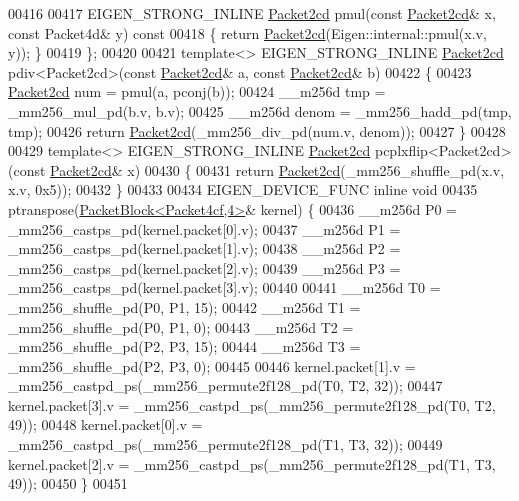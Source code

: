 \begin{DoxyCode}
00416 
00417   EIGEN\_STRONG\_INLINE \hyperlink{struct_eigen_1_1internal_1_1_packet2cd}{Packet2cd} pmul(\textcolor{keyword}{const} \hyperlink{struct_eigen_1_1internal_1_1_packet2cd}{Packet2cd}& x, \textcolor{keyword}{const} Packet4d& y)\textcolor{keyword}{ const}
00418 \textcolor{keyword}{  }\{ \textcolor{keywordflow}{return} \hyperlink{struct_eigen_1_1internal_1_1_packet2cd}{Packet2cd}(Eigen::internal::pmul(x.v, y)); \}
00419 \};
00420 
00421 \textcolor{keyword}{template}<> EIGEN\_STRONG\_INLINE \hyperlink{struct_eigen_1_1internal_1_1_packet2cd}{Packet2cd} pdiv<Packet2cd>(\textcolor{keyword}{const} 
      \hyperlink{struct_eigen_1_1internal_1_1_packet2cd}{Packet2cd}& a, \textcolor{keyword}{const} \hyperlink{struct_eigen_1_1internal_1_1_packet2cd}{Packet2cd}& b)
00422 \{
00423   \hyperlink{struct_eigen_1_1internal_1_1_packet2cd}{Packet2cd} num = pmul(a, pconj(b));
00424   \_\_m256d tmp = \_mm256\_mul\_pd(b.v, b.v);
00425   \_\_m256d denom = \_mm256\_hadd\_pd(tmp, tmp);
00426   \textcolor{keywordflow}{return} \hyperlink{struct_eigen_1_1internal_1_1_packet2cd}{Packet2cd}(\_mm256\_div\_pd(num.v, denom));
00427 \}
00428 
00429 \textcolor{keyword}{template}<> EIGEN\_STRONG\_INLINE \hyperlink{struct_eigen_1_1internal_1_1_packet2cd}{Packet2cd} pcplxflip<Packet2cd>(\textcolor{keyword}{const} 
      \hyperlink{struct_eigen_1_1internal_1_1_packet2cd}{Packet2cd}& x)
00430 \{
00431   \textcolor{keywordflow}{return} \hyperlink{struct_eigen_1_1internal_1_1_packet2cd}{Packet2cd}(\_mm256\_shuffle\_pd(x.v, x.v, 0x5));
00432 \}
00433 
00434 EIGEN\_DEVICE\_FUNC \textcolor{keyword}{inline} \textcolor{keywordtype}{void}
00435 ptranspose(\hyperlink{struct_eigen_1_1internal_1_1_packet_block}{PacketBlock<Packet4cf,4>}& kernel) \{
00436   \_\_m256d P0 = \_mm256\_castps\_pd(kernel.packet[0].v);
00437   \_\_m256d P1 = \_mm256\_castps\_pd(kernel.packet[1].v);
00438   \_\_m256d P2 = \_mm256\_castps\_pd(kernel.packet[2].v);
00439   \_\_m256d P3 = \_mm256\_castps\_pd(kernel.packet[3].v);
00440 
00441   \_\_m256d T0 = \_mm256\_shuffle\_pd(P0, P1, 15);
00442   \_\_m256d T1 = \_mm256\_shuffle\_pd(P0, P1, 0);
00443   \_\_m256d T2 = \_mm256\_shuffle\_pd(P2, P3, 15);
00444   \_\_m256d T3 = \_mm256\_shuffle\_pd(P2, P3, 0);
00445 
00446   kernel.packet[1].v = \_mm256\_castpd\_ps(\_mm256\_permute2f128\_pd(T0, T2, 32));
00447   kernel.packet[3].v = \_mm256\_castpd\_ps(\_mm256\_permute2f128\_pd(T0, T2, 49));
00448   kernel.packet[0].v = \_mm256\_castpd\_ps(\_mm256\_permute2f128\_pd(T1, T3, 32));
00449   kernel.packet[2].v = \_mm256\_castpd\_ps(\_mm256\_permute2f128\_pd(T1, T3, 49));
00450 \}
00451 

\end{DoxyCode}

